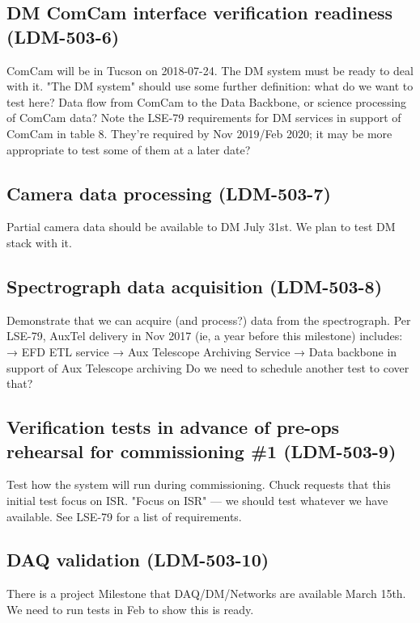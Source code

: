 \subsection{DM ComCam interface verification readiness \textbf{(LDM-503-6)}\label{LDM-503-6}}
ComCam will be in Tucson on 2018-07-24. The DM system must be ready to deal with it.
 \newline
"The DM system" should use some further definition: what do we want to test here? Data flow from ComCam to the Data Backbone, or science processing of ComCam data?
 Note the LSE-79 requirements for DM services in support of ComCam in table 8. They're required by Nov 2019/Feb 2020; it may be more appropriate to test some of them at a later date?
\subsection{Camera data processing \textbf{(LDM-503-7)}\label{LDM-503-7}}
Partial camera data should be available to DM July 31st. We plan to test DM stack with it.
 \newline

\subsection{Spectrograph data acquisition \textbf{(LDM-503-8)}\label{LDM-503-8}}
Demonstrate that we can acquire (and process?) data from the spectrograph.
 \newline
Per LSE-79, AuxTel delivery in Nov 2017 (ie, a year before this milestone) includes: → EFD ETL service → Aux Telescope Archiving Service → Data backbone in support of Aux Telescope archiving Do we need to schedule another test to cover that?
\subsection{Verification tests in advance of pre-ops rehearsal for commissioning \#1 \textbf{(LDM-503-9)}\label{LDM-503-9}}
Test how the system will run during commissioning.
 Chuck requests that this initial test focus on ISR.
 \newline
"Focus on ISR" — we should test whatever we have available. See LSE-79 for a list of requirements.
\subsection{DAQ validation \textbf{(LDM-503-10)}\label{LDM-503-10}}
There is a project Milestone that DAQ/DM/Networks are available March 15th. We need to run tests in Feb to show this is ready.
 \newline

